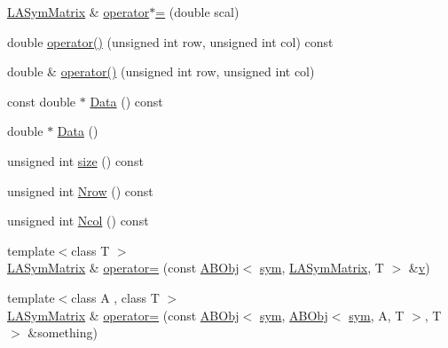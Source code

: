 \begin{DoxyCompactItemize}
\item 
\mbox{\hyperlink{classROOT_1_1Minuit2_1_1LASymMatrix}{L\+A\+Sym\+Matrix}} \& \mbox{\hyperlink{classROOT_1_1Minuit2_1_1LASymMatrix_abb10e4e092df8072bf59de3a0880b336}{operator$\ast$=}} (double scal)
\item 
double \mbox{\hyperlink{classROOT_1_1Minuit2_1_1LASymMatrix_a3a1a954a9e1ab78f255146ccd76d3847}{operator()}} (unsigned int row, unsigned int col) const
\item 
double \& \mbox{\hyperlink{classROOT_1_1Minuit2_1_1LASymMatrix_a580d204fdc526218483e7b2e276da265}{operator()}} (unsigned int row, unsigned int col)
\item 
const double $\ast$ \mbox{\hyperlink{classROOT_1_1Minuit2_1_1LASymMatrix_ab1fb932a4ad517108a3b58473b6d8803}{Data}} () const
\item 
double $\ast$ \mbox{\hyperlink{classROOT_1_1Minuit2_1_1LASymMatrix_abb2b699b82e6aa2803d01e16683433eb}{Data}} ()
\item 
unsigned int \mbox{\hyperlink{classROOT_1_1Minuit2_1_1LASymMatrix_af924c1e0eb1578716a8cb8940cc08563}{size}} () const
\item 
unsigned int \mbox{\hyperlink{classROOT_1_1Minuit2_1_1LASymMatrix_ac76b44933bc4b144b8671c089b8d7ef5}{Nrow}} () const
\item 
unsigned int \mbox{\hyperlink{classROOT_1_1Minuit2_1_1LASymMatrix_a36bb0f349110a80cb742953ae68fc9c5}{Ncol}} () const
\item 
{\footnotesize template$<$class T $>$ }\\\mbox{\hyperlink{classROOT_1_1Minuit2_1_1LASymMatrix}{L\+A\+Sym\+Matrix}} \& \mbox{\hyperlink{classROOT_1_1Minuit2_1_1LASymMatrix_a6c1a413ac701804116e0e395334edc3b}{operator=}} (const \mbox{\hyperlink{classROOT_1_1Minuit2_1_1ABObj}{A\+B\+Obj}}$<$ \mbox{\hyperlink{classROOT_1_1Minuit2_1_1sym}{sym}}, \mbox{\hyperlink{classROOT_1_1Minuit2_1_1LASymMatrix}{L\+A\+Sym\+Matrix}}, T $>$ \&\mbox{\hyperlink{hadron__timeslice_8cc_a716fc87f5e814be3ceee2405ed6ff22a}{v}})
\item 
{\footnotesize template$<$class A , class T $>$ }\\\mbox{\hyperlink{classROOT_1_1Minuit2_1_1LASymMatrix}{L\+A\+Sym\+Matrix}} \& \mbox{\hyperlink{classROOT_1_1Minuit2_1_1LASymMatrix_ad9610e3f4b18a52ab16644373e179acc}{operator=}} (const \mbox{\hyperlink{classROOT_1_1Minuit2_1_1ABObj}{A\+B\+Obj}}$<$ \mbox{\hyperlink{classROOT_1_1Minuit2_1_1sym}{sym}}, \mbox{\hyperlink{classROOT_1_1Minuit2_1_1ABObj}{A\+B\+Obj}}$<$ \mbox{\hyperlink{classROOT_1_1Minuit2_1_1sym}{sym}}, A, T $>$, T $>$ \&something)

\end{DoxyCompactItemize}
